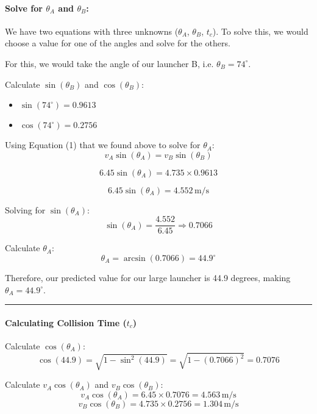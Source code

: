 \documentclass[12pt]{article}
\begin{document}
\paragraph{\large \textbf{Solve for \( \theta_A \) and \( \theta_B \):}}

We have two equations with three unknowns (\( \theta_A \), \( \theta_B \), \( t_c \)). 
To solve this, we would choose a value for one of the angles and solve for the others.

For this, we would take the angle of our launcher B, i.e. \( \theta_B = 74^\circ \).

Calculate \( \sin(\theta_B) \) and \( \cos(\theta_B) \):
\begin{itemize}
    \item \( \sin(74^\circ) = 0.9613 \)
    \item \( \cos(74^\circ) = 0.2756 \)
\end{itemize}

Using Equation (1) that we found above to solve for \( \theta_A \):
\[
v_A \sin(\theta_A) = v_B \sin(\theta_B)
\]

\[
6.45 \sin(\theta_A) = 4.735 \times 0.9613
\]

\[
6.45 \sin(\theta_A) = 4.552 \, \text{m/s}
\]

Solving for \( \sin(\theta_A) \):
\[
\sin(\theta_A) = \frac{4.552}{6.45} \Rightarrow 0.7066
\]

Calculate \( \theta_A \):
\[
\theta_A = \arcsin(0.7066) = 44.9^\circ
\]

Therefore, our predicted value for our large launcher is 44.9 degrees, making \( \theta_A = 44.9^\circ \).
\vspace{0.5cm} %
\begin{center}
    \rule{0.9\textwidth}{0.5pt} %
\end{center}
\vspace{0.5cm} %

\paragraph{\large \textbf{Calculating Collision Time (\( t_c \))}}

Calculate \( \cos(\theta_A) \):
\[
\cos(44.9) = \sqrt{1 - \sin^2(44.9)} = \sqrt{1 - (0.7066)^2} = 0.7076
\]

Calculate \( v_A \cos(\theta_A) \) and \( v_B \cos(\theta_B) \):
\[
v_A \cos(\theta_A) = 6.45 \times 0.7076 = 4.563 \, \text{m/s}
\]
\[
v_B \cos(\theta_B) = 4.735 \times 0.2756 = 1.304 \, \text{m/s}
\]
\end{document}
